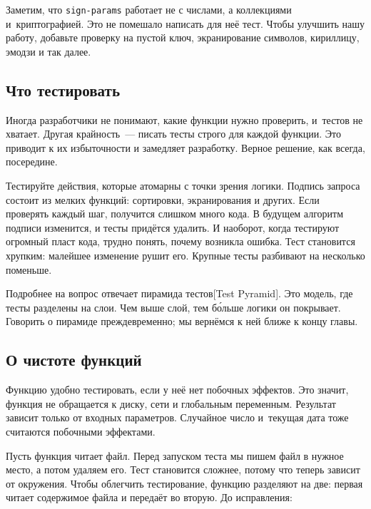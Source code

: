 Заметим, что \verb|sign-params| работает не с числами, а коллекциями
и~криптографией. Это не помешало написать для неё тест. Чтобы улучшить нашу
работу, добавьте проверку на пустой ключ, экранирование символов, кириллицу,
эмодзи и так далее.

\subsection{Что тестировать}

Иногда разработчики не понимают, какие функции нужно проверить, и~тестов не
хватает. Другая крайность~--- писать тесты строго для каждой функции. Это
приводит к их избыточности и замедляет разработку. Верное решение, как всегда,
посередине.

Тестируйте действия, которые атомарны с точки зрения логики. Подпись запроса
состоит из мелких функций: сортировки, экранирования и других. Если проверять
каждый шаг, получится слишком много кода. В будущем алгоритм подписи изменится,
и тесты придётся удалить. И наоборот, когда тестируют огромный пласт кода,
трудно понять, почему возникла ошибка. Тест становится хрупким: малейшее
изменение рушит его. Крупные тесты разбивают на несколько поменьше.


Подробнее на вопрос отвечает пирамида
тестов[Test Pyramid].
Это модель, где тесты разделены на слои. Чем выше слой, тем б\'{о}льше логики он
покрывает. Говорить о пирамиде преждевременно; мы вернёмся к ней ближе к концу
главы.

\subsection{О чистоте функций}


Функцию удобно тестировать, если у неё нет побочных эффектов. Это значит,
функция не обращается к диску, сети и глобальным переменным. Результат зависит
только от входных параметров. Случайное число и~текущая дата тоже считаются
побочными эффектами.

Пусть функция читает файл. Перед запуском теста мы пишем файл в нужное место, а
потом удаляем его. Тест становится сложнее, потому что теперь зависит от
окружения. Чтобы облегчить тестирование, функцию разделяют на две: первая читает
содержимое файла и передаёт во вторую. До исправления:

